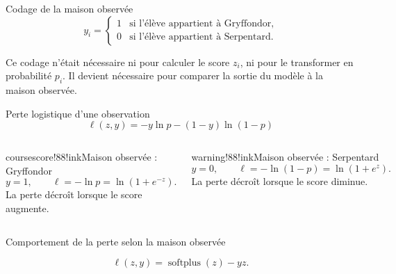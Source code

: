 \begin{frame}[t]{Codage de la maison observée}
  \vspace{5mm}
  \[
    y_i=
    \begin{cases}
      1 & \text{si l'élève appartient à Gryffondor},\\
      0 & \text{si l'élève appartient à Serpentard}.
    \end{cases}
  \]
  \vspace{5mm}
  \begin{resultat}
    Ce codage n'était nécessaire ni pour calculer le score \(z_i\), ni pour le
    transformer en probabilité \(p_i\). Il devient nécessaire pour comparer la
    sortie du modèle à la maison observée.
  \end{resultat}
\end{frame}

\begin{frame}[t]{Perte logistique d'une observation}
  \vspace{3mm}
  \[
    \boxed{\ell(z,y)=-y\ln p-(1-y)\ln(1-p)}
  \]
  \begin{columns}[T,onlytextwidth]
      \begin{coursecallout}{coursescore!88!ink}{Maison observée : Gryffondor}
        \[
          y=1,\qquad \ell=-\ln p=\ln(1+e^{-z}).
        \]
        La perte décroît lorsque le score augmente.
      \end{coursecallout}
      \begin{coursecallout}{warning!88!ink}{Maison observée : Serpentard}
        \[
          y=0,\qquad \ell=-\ln(1-p)=\ln(1+e^z).
        \]
        La perte décroît lorsque le score diminue.
      \end{coursecallout}
  \end{columns}
\end{frame}

\begin{frame}[t]{Comportement de la perte selon la maison observée}
  \centering
  \[
    \ell(z,y)=\operatorname{softplus}(z)-yz.
  \]
\end{frame}

